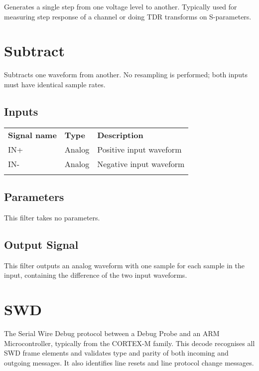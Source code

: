 Generates a single step from one voltage level to another. Typically used for measuring step response of a channel or
doing TDR transforms on S-parameters.

\pagebreak
\section{Subtract}


Subtracts one waveform from another. No resampling is performed; both inputs must have identical sample rates.

\subsection{Inputs}

\begin{tabularx}{16cm}{llX}
\thickhline
\textbf{Signal name} & \textbf{Type} & \textbf{Description} \\
\thickhline
IN+ & Analog & Positive input waveform \\
\thinhline
IN- & Analog & Negative input waveform \\
\thickhline
\end{tabularx}

\subsection{Parameters}

This filter takes no parameters.

\subsection{Output Signal}

This filter outputs an analog waveform with one sample for each sample in the input, containing the difference of the
two input waveforms.

\pagebreak
\section{SWD}

The Serial Wire Debug protocol between a Debug Probe and an ARM Microcontroller, typically from the CORTEX-M family. This
decode recognises all SWD frame elements and validates type and parity of both incoming and outgoing messages. It also
identifies line resets and line protocol change messages.

